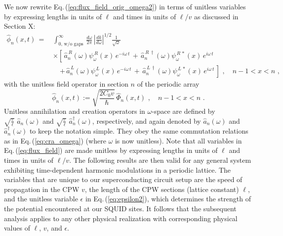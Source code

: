 We now rewrite Eq.\,(\ref{eq:flux_field_orig_omega2}) in terms of unitless variables 
by expressing lengths in units of $\ell$ and times in units of $\ell/v$
as discussed in \color{red} Section X: \color{black}
%
\begin{equation} \label{eq:flux_field}
\begin{split}
    \hat{\phi}_n(x,t) \, = \, &
    \int_{0, \, \text{w/o gaps}}^{\infty} \, \frac{d\omega}{2 \pi} \, \left| \frac{d k}{d \omega} \right|^{1/2}
        \frac{1}{\sqrt{\omega}} \\[2mm]
    & \times \left[\, \hat{a}_n^{\,R}(\omega) \psi_{\omega}^{\,R}(x) \, e^{-i \omega \, t} \, + \,
    \hat{a}_n^{\,R \, \dagger}(\omega) \psi_{\omega}^{\,R \, *}(x) \, e^{i \omega \, t} \right. \\[2mm]
    & \quad \left. + \, \hat{a}_n^{\,L}(\omega) \psi_{\omega}^{\,L}(x) \, e^{-i \omega \, t} \, + \,
    \hat{a}_n^{\,L \, \dagger}(\omega) \psi_{\omega}^{\,L \, *}(x) \, e^{i \omega \, t} \, \right]
    \, \, , \quad n-1 < x < n \, \, ,
\end{split}
\end{equation}
%
with the unitless field operator in section $n$ of the periodic array
%
\begin{equation} \label{eq:ufo}
\hat{\phi}_n(x,t) := \sqrt{\frac{2 C_0 v}{\hbar}} \, \hat{\Phi}_n(x,t) \, \, , \quad n-1 < x < n \, \, .
\end{equation}
%
Unitless annihilation and creation operators in $\omega$-space are defined by 
$\displaystyle{\sqrt{\frac{v}{\ell}} \, \, \hat{a}_n(\omega)}$ 
and 
$\displaystyle{\sqrt{\frac{v}{\ell}} \, \, \hat{a}_n^\dagger(\omega)}$,
respectively, and again denoted by
%
$\hat{a}_n(\omega)$ and $\hat{a}_n^\dagger(\omega)$ to keep the notation simple. 
They obey the same commutation relations as in Eq.\,(\ref{eq:cra_omega}) (where $\omega$ is now unitless).
%
Note that all variables in Eq.\,(\ref{eq:flux_field}) are made unitless by expressing lengths in units of $\ell$ and times in units of $\ell/v$. The following results are then valid for any general system exhibiting time-dependent harmonic modulations in a periodic lattice. The variables that are unique to our superconducting circuit setup are the speed of propagation in the CPW $v$, the length of the CPW sections (lattice constant) $\ell$, 
and the unitless variable $\epsilon$ in Eq.\,(\ref{eq:epsilon2}), 
which determines the strength of the potential encountered at our SQUID sites. It follows that the subsequent analysis applies to any other physical realization with corresponding physical values of $\ell$, $v$, and $\epsilon$.

